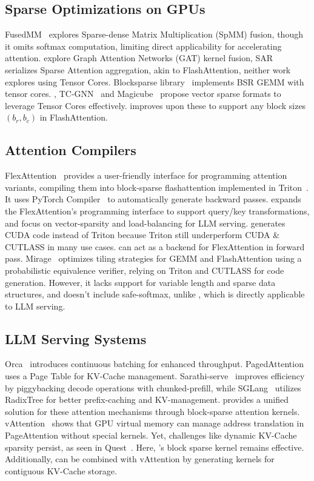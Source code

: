 \subsection{Sparse Optimizations on GPUs}

FusedMM~\citep{rahman2021fusedmm} explores Sparse-dense Matrix Multiplication (SpMM) fusion, though it omits softmax computation, limiting direct applicability for accelerating attention. \citet{zhang2022fusedgat} explore Graph Attention Networks (GAT) kernel fusion, SAR~\citep{mostafa2022sar} serializes Sparse Attention aggregation, akin to FlashAttention, neither work explores using Tensor Cores. Blocksparse library~\citep{gray2017gpu-bsr} implements BSR GEMM with tensor cores. \citet{chen2021tensorcoressparsity}, TC-GNN~\citep{wang2023tcgnn} and Magicube~\citep{li2022magicube} propose vector sparse formats to leverage Tensor Cores effectively. \sys improves upon these to support any block sizes $(b_r, b_c)$ in FlashAttention.

\subsection{Attention Compilers}

FlexAttention~\citep{he2024flexattention} provides a user-friendly interface for programming attention variants, compiling them into block-sparse flashattention implemented in Triton~\citep{triton}. It uses PyTorch Compiler~\citep{jason2024pytorch2} to automatically generate backward passes. \sys expands the FlexAttention's programming interface to support query/key transformations, and focus on vector-sparsity and load-balancing for LLM serving. \sys generates CUDA code instead of Triton because Triton still underperform CUDA \& CUTLASS in many use cases. \sys can act as a backend for FlexAttention in forward pass. Mirage~\citep{wu2024mirage} optimizes tiling strategies for GEMM and FlashAttention using a probabilistic equivalence verifier, relying on Triton and CUTLASS for code generation. However, it lacks support for variable length and sparse data structures, and doesn't include safe-softmax, unlike \sys, which is directly applicable to LLM serving.

\subsection{LLM Serving Systems}

Orca~\citep{yu2022orca} introduces continuous batching for enhanced throughput. PagedAttention~\citep{kwon2023vllm} uses a Page Table for KV-Cache management. Sarathi-serve~\citep{agrawal2024sarathi} improves efficiency by piggybacking decode operations with chunked-prefill, while SGLang~\citep{zheng2023sglang} utilizes RadixTree for better prefix-caching and KV-management. \sys provides a unified solution for these attention mechanisms through block-sparse attention kernels. vAttention~\citep{prabhu2024vattention} shows that GPU virtual memory can manage address translation in PageAttention without special kernels. Yet, challenges like dynamic KV-Cache sparsity persist, as seen in Quest~\citep{tang2024quest}. Here, \sys's block sparse kernel remains effective. Additionally, \sys can be combined with vAttention by generating kernels for contiguous KV-Cache storage.
